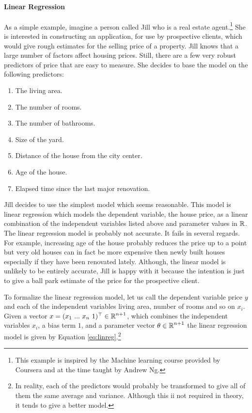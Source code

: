 \paragraph{Linear Regression} As a simple example, imagine a person
called Jill who is a real estate agent.\footnote{This example is
  inspired by the Machine learning course provided by Coursera and at
  the time taught by Andrew Ng.} She is interested in constructing an
application, for use by prospective clients, which would give rough
estimates for the selling price of a property. Jill knows that a large
number of factors affect housing prices. Still, there are a few very
robust predictors of price that are easy to measure.
She decides to base the model on the following predictors:
\begin{enumerate}
\item The living area.
\item The number of rooms.
\item The number of bathrooms.
\item Size of the yard.
\item Distance of the house from the city center.
\item Age of the house.
\item Elapsed time since the last major renovation.
\end{enumerate}

Jill decides to use the simplest model which seems reasonable. This
model is linear regression which models the dependent
  variable, the house price, as a linear combination of the independent
variables listed above and parameter values in $\mbox{$\mathbb R$}$. The linear
regression model is probably not accurate. It fails in several
regards. For example, increasing age of the house probably reduces the
price up to a point but very old houses can in fact be more expensive
then newly built houses especially if they have been renovated lately.
Although, the linear model is unlikely to be entirely accurate, Jill is
happy with it because the intention is just to give a ball park
estimate of the price for the prospective client.

To formalize the linear regression model, let us call the dependent
variable price $y$ and each of the independent variables living area,
number of rooms and so on $x_i$. Given a vector $x = (x_1\ ...\
x_n\ 1)^\top \in \mbox{$\mathbb R$}^{n+1}$, which combines the independent
variables $x_i$, a bias term $1$, and a parameter vector $\theta \in
\mbox{$\mathbb R$}^{n+1}$ the linear regression model is given by Equation
\ref{eq:linreg}.\footnote{In reality, each of the predictors would probably
  be transformed to give all of them the same average and
  variance. Although this ii not required in theory, it tends to give
  a better model.}

